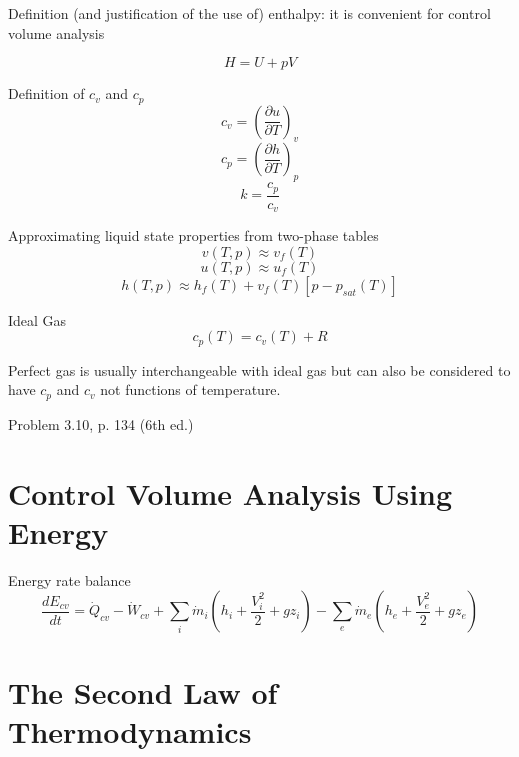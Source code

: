 \documentclass[paper=letter, fontsize=11pt]{scrartcl}
\numberwithin{equation}{section}        %
\numberwithin{figure}{section}          %
\numberwithin{table}{section}               %
\begin{document}
Definition (and justification of the use of) enthalpy: it is convenient for control volume analysis

\begin{equation}
    H=U+pV
\end{equation}

Definition of $c_v$ and $c_p$ 
\begin{equation}
    c_v = \left(\frac{\partial u}{\partial T}\right)_v
\end{equation}
\begin{equation}
    c_p = \left(\frac{\partial h}{\partial T}\right)_p
\end{equation}
\begin{equation}
    k = \frac{c_p}{c_v}
\end{equation}

Approximating liquid state properties from two-phase tables
\begin{equation}
    v(T,p)\approx v_f(T)
\end{equation}
\begin{equation}
    u(T,p)\approx u_f(T)
\end{equation}
\begin{equation}
    h(T,p)\approx h_f(T) + v_f(T)[p-p_{sat}(T)]
\end{equation}

Ideal Gas
\begin{equation}
    c_p(T) = c_v(T)+R
\end{equation}

Perfect gas is usually interchangeable with ideal gas but can also be considered to have $c_p$ and $c_v$ not functions of temperature.

Problem 3.10, p. 134 (6th ed.)

\newpage
\section{Control Volume Analysis Using Energy}

Energy rate balance
\begin{equation}
    \frac{dE_{cv}}{dt} = \dot Q_{cv} -  \dot W_{cv} + \sum_i \dot m_i \left(h_i + \frac{V_i^2}{2} + gz_i \right) - \sum_e \dot m_e \left(h_e + \frac{V_e^2}{2} + gz_e \right) 
\end{equation}

\newpage
\section{The Second Law of Thermodynamics}
\end{document}
